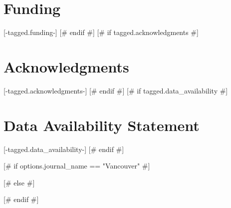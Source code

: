 \documentclass[utf8]{FrontiersinVancouver} %
[# else #]
\begin{document}
\section*{Funding}
[-tagged.funding-]
[# endif #]
[# if tagged.acknowledgments #]
\section*{Acknowledgments}
[-tagged.acknowledgments-]
[# endif #]
[# if tagged.data_availability #]
\section*{Data Availability Statement}
[-tagged.data_availability-]
[# endif #]

[# if options.journal_name == "Vancouver" #]

% 
[# else #]

% 
[# endif #]



\end{document}
